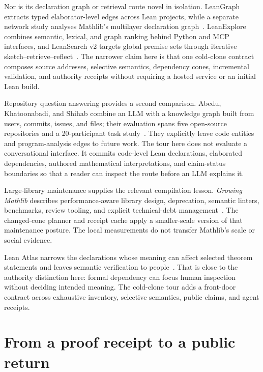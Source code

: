 \documentclass[11pt]{article}
\begin{document}
Nor is its declaration graph or retrieval route novel in isolation.
LeanGraph extracts typed elaborator-level edges across Lean projects, while a
separate network study analyses Mathlib's multilayer declaration
graph~\cite{theoremgraph,mathlibnetwork}. LeanExplore combines semantic,
lexical, and graph ranking behind Python and MCP interfaces, and LeanSearch v2
targets global premise sets through iterative
sketch--retrieve--reflect~\cite{leanexplore,leansearchv2}. The narrower claim
here is that one cold-clone contract composes source addresses, selective
semantics, dependency cones, incremental validation, and authority receipts
without requiring a hosted service or an initial Lean build.

Repository question answering provides a second comparison. Abedu,
Khatoonabadi, and Shihab combine an LLM with a knowledge graph built from
users, commits, issues, and files; their evaluation spans five open-source
repositories and a 20-participant task study~\cite{repokg}. They explicitly
leave code entities and program-analysis edges to future work. The tour here
does not evaluate a conversational interface. It commits code-level Lean
declarations, elaborated dependencies, authored mathematical interpretations,
and claim-status boundaries so that a reader can inspect the route before an
LLM explains it.

Large-library maintenance supplies the relevant compilation lesson.
\emph{Growing Mathlib} describes performance-aware library design,
deprecation, semantic linters, benchmarks, review tooling, and explicit
technical-debt management~\cite{growingmathlib}. The changed-cone planner and
receipt cache apply a smaller-scale version of that maintenance posture. The
local measurements do not transfer Mathlib's scale or social evidence.

Lean Atlas narrows the declarations whose meaning can affect selected theorem
statements and leaves semantic verification to people~\cite{leanatlas}. That
is close to the authority distinction here: formal dependency can focus human
inspection without deciding intended meaning. The cold-clone tour adds a
front-door contract across exhaustive inventory, selective semantics, public
claims, and agent receipts.

\section{From a proof receipt to a public return}\label{sec:return}
\end{document}
